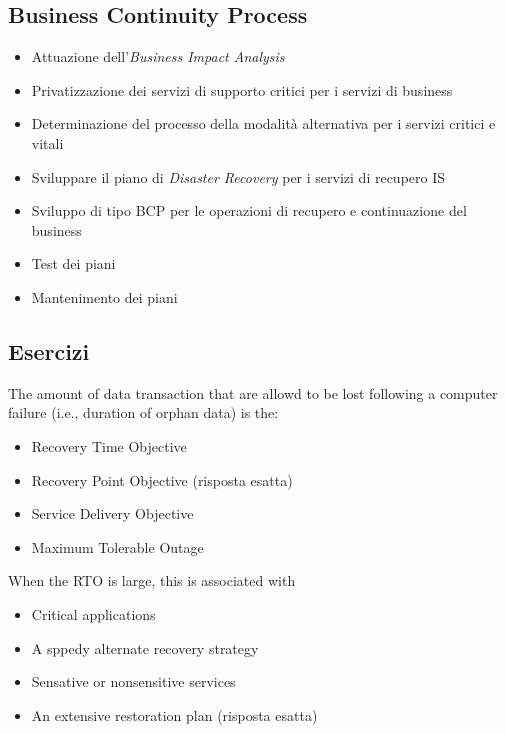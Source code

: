 \subsection{Business Continuity Process}

\begin{itemize}
  \item Attuazione dell'\textit{Business Impact Analysis}
  \item Privatizzazione dei servizi di supporto critici per i servizi di 
  business
  \item Determinazione del processo della modalità alternativa per i servizi 
  critici e vitali
  \item Sviluppare il piano di \textit{Disaster Recovery} per i servizi di 
  recupero IS
  \item Sviluppo di tipo BCP per le operazioni di recupero e continuazione del 
  business
  \item Test dei piani
  \item Mantenimento dei piani
\end{itemize}

\subsection{Esercizi}

The amount of data transaction that are allowd to be lost following a computer 
failure (i.e., duration of orphan data) is the:
\begin{itemize}
  \item Recovery Time Objective
  \item Recovery Point Objective (risposta esatta)
  \item Service Delivery Objective
  \item Maximum Tolerable Outage
\end{itemize}


When the RTO is large, this is associated with
\begin{itemize}
  \item Critical applications
  \item A sppedy alternate recovery strategy
  \item Sensative or nonsensitive services
  \item An extensive restoration plan (risposta esatta)
\end{itemize}


